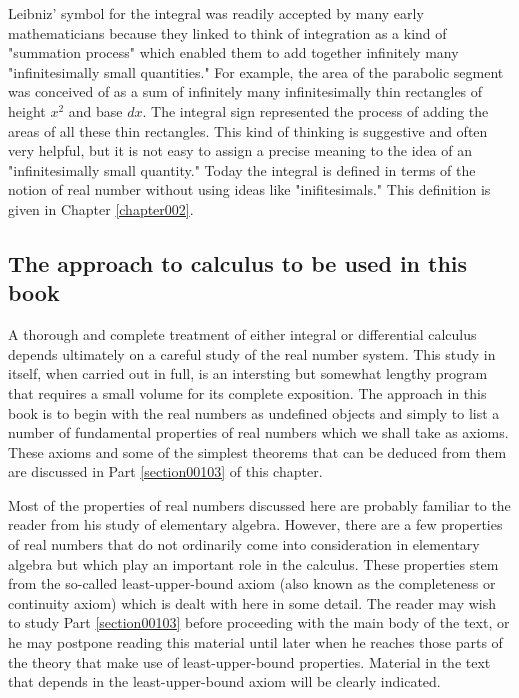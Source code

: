 \documentclass[cn,11pt,chinese]{elegantbook}
\numberwithin{equation}{section}
\begin{document}
Leibniz' symbol for the integral was readily accepted by many early mathematicians because they linked to think of integration as a kind of "summation process" which enabled them to add together infinitely many "infinitesimally small quantities." For example, the area of the parabolic segment was conceived of as a sum of infinitely many infinitesimally thin rectangles of height $x^2$ and base $dx$. The integral sign represented the process of adding the areas of all these thin rectangles. This kind of thinking is suggestive and often very helpful, but it is not easy to assign a precise meaning to the idea of an "infinitesimally small quantity." Today the integral is defined in terms of the notion of real number without using ideas like "inifitesimals." This definition is given in Chapter \ref{chapter002}.


\subsection{The approach to calculus to be used in this book}
A thorough and complete treatment of either integral or differential calculus depends ultimately on a careful study of the real number system. This study in itself, when carried out in full, is an intersting but somewhat lengthy program that requires a small volume for its complete exposition. The approach in this book is to begin with the real numbers as undefined objects and simply to list a number of fundamental properties of real numbers which we shall take as axioms. These axioms and some of the simplest theorems that can be deduced from them are discussed in Part \ref{section00103} of this chapter.

Most of the properties of real numbers discussed here are probably familiar to the reader from his study of elementary algebra. However, there are a few properties of real numbers that do not ordinarily come into consideration in elementary algebra but which play an important role in the calculus. These properties stem from the so-called least-upper-bound axiom (also known as the completeness or continuity axiom) which is dealt with here in some detail. The reader may wish to study Part \ref{section00103} before proceeding with the main body of the text, or he may postpone reading this material until later when he reaches those parts of the theory that make use of least-upper-bound properties. Material in the text that depends in the least-upper-bound axiom will be clearly indicated.
\end{document}
